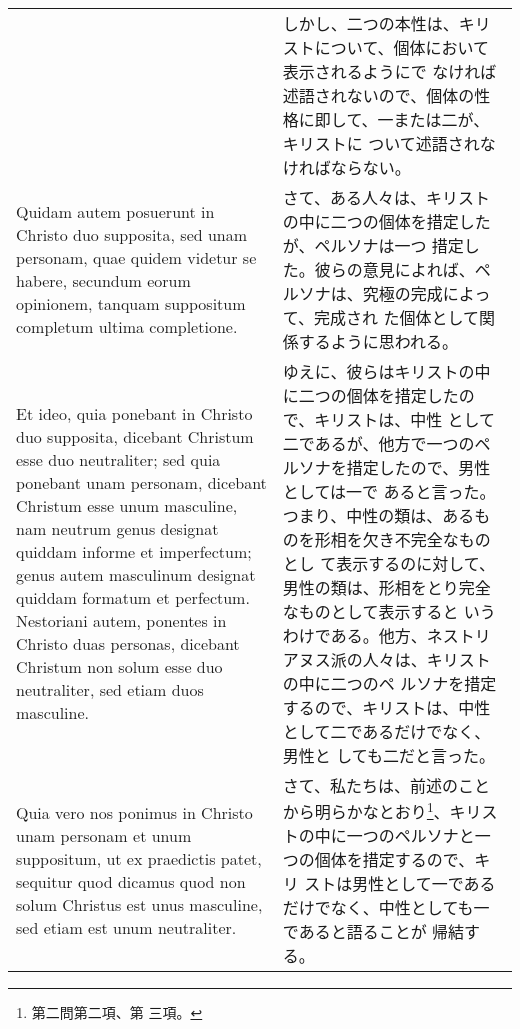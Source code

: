 \documentclass[10pt]{jsarticle} %
\begin{document}
\begin{longtable}{p{21em}p{21em}}
&


しかし、二つの本性は、キリストについて、個体において表示されるようにで
なければ述語されないので、個体の性格に即して、一または二が、キリストに
ついて述語されなければならない。

\\

Quidam autem posuerunt in
 Christo duo supposita, sed unam personam, quae quidem videtur se
 habere, secundum eorum opinionem, tanquam suppositum completum ultima
 completione. 


&

さて、ある人々は、キリストの中に二つの個体を措定したが、ペルソナは一つ
措定した。彼らの意見によれば、ペルソナは、究極の完成によって、完成され
た個体として関係するように思われる。


\\

Et ideo, quia ponebant in Christo duo supposita, dicebant Christum
esse duo neutraliter; sed quia ponebant unam personam, dicebant
Christum esse unum masculine, nam neutrum genus designat quiddam
informe et imperfectum; genus autem masculinum designat quiddam
formatum et perfectum. Nestoriani autem, ponentes in Christo duas
personas, dicebant Christum non solum esse duo neutraliter, sed etiam
duos masculine.

&

ゆえに、彼らはキリストの中に二つの個体を措定したので、キリストは、中性
として二であるが、他方で一つのペルソナを措定したので、男性としては一で
あると言った。つまり、中性の類は、あるものを形相を欠き不完全なものとし
て表示するのに対して、男性の類は、形相をとり完全なものとして表示すると
いうわけである。他方、ネストリアヌス派の人々は、キリストの中に二つのペ
ルソナを措定するので、キリストは、中性として二であるだけでなく、男性と
しても二だと言った。



\\

Quia vero nos ponimus in Christo unam personam et unum suppositum, ut
ex praedictis patet, sequitur quod dicamus quod non solum Christus est
unus masculine, sed etiam est unum neutraliter.


&

さて、私たちは、前述のことから明らかなとおり\footnote{第二問第二項、第
 三項。}、キリストの中に一つのペルソナと一つの個体を措定するので、キリ
 ストは男性として一であるだけでなく、中性としても一であると語ることが
 帰結する。




\end{longtable}
\end{document}
